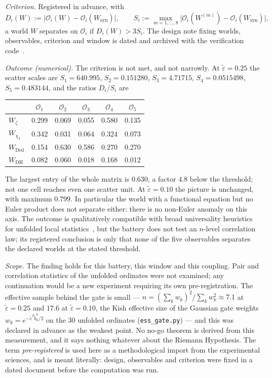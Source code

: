 \documentclass[11pt]{article}
\begin{document}
\emph{Criterion.} Registered in advance, with
\[
D_i(W):=\bigl|\mathcal{O}_i(W)-\mathcal{O}_i(W_{\mathrm{syn}})\bigr|,
\qquad
S_i:=\max_{m=1,\dots,8}
\bigl|\mathcal{O}_i(W^{(m)})-\mathcal{O}_i(W_{\mathrm{syn}})\bigr|,
\]
a world $W$ separates on $\mathcal{O}_i$ if $D_i(W)>3S_i$. The design note fixing worlds, observables, criterion and window
is dated and archived with the verification code~\cite{Code}.

\emph{Outcome (numerical).} The criterion is not met, and not narrowly. At
$\tilde\varepsilon=0.25$ the scatter scales are
$S_1=640.995$, $S_2=0.151280$, $S_3=4.71715$, $S_4=0.0515498$,
$S_5=0.483144$, and the ratios $D_i/S_i$ are

\begin{center}
\begin{tabular}{@{}lccccc@{}}
\toprule
 & $\mathcal{O}_1$ & $\mathcal{O}_2$ & $\mathcal{O}_3$ & $\mathcal{O}_4$
 & $\mathcal{O}_5$ \\
\midrule
$W_\zeta$            & 0.299 & 0.069 & 0.055 & 0.580 & 0.135 \\
$W_{\chi_4}$         & 0.342 & 0.031 & 0.064 & 0.324 & 0.073 \\
$W_{\mathrm{Ded}}$   & 0.154 & 0.630 & 0.586 & 0.270 & 0.270 \\
$W_{\mathrm{DH}}$    & 0.082 & 0.060 & 0.018 & 0.168 & 0.012 \\
\bottomrule
\end{tabular}
\end{center}

The largest entry of the whole matrix is $0.630$, a factor $4.8$ below the
threshold; not one cell reaches even one scatter unit. At
$\tilde\varepsilon=0.10$ the picture is unchanged, with maximum $0.799$. In
particular the world with a functional equation but no Euler product does not
separate either: there is no non-Euler anomaly on this axis. The outcome is
qualitatively compatible with broad universality heuristics for unfolded local
statistics~\cite{RudnickSarnak96}, but the battery does not test an $n$-level
correlation law; its registered conclusion is only that none of the five
observables separates the declared worlds at the stated threshold.

\emph{Scope.} The finding holds for this battery, this window and this
coupling. Pair and correlation statistics of the unfolded ordinates were not
examined; any continuation would be a new experiment requiring its own
pre-registration. The effective sample behind the gate is small ---
$n=(\sum_kw_k)^2/\sum_kw_k^2\approx7.1$ at $\tilde\varepsilon=0.25$ and
$17.6$ at $\tilde\varepsilon=0.10$, the Kish effective size of the Gaussian
gate weights $w_k=e^{-\tilde\varepsilon^2\tilde b_k^2/2}$ on the $30$
unfolded ordinates (\texttt{ess\_gate.py}) --- and this was declared in
advance as the weakest point. No no-go theorem is derived from
this measurement, and it says nothing whatever about the Riemann Hypothesis.
The term \emph{pre-registered} is used here as a methodological import from
the experimental sciences, and is meant literally: design, observables and
criterion were fixed in a dated document before the computation was run.
\end{document}
